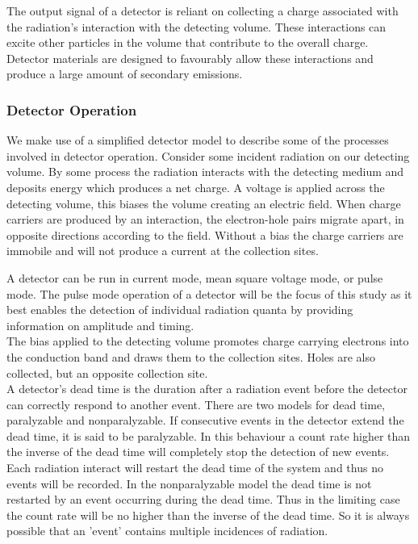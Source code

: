 \documentclass[12pt]{article}
\begin{document}
\begin{doublespacing}
The output signal of a detector is reliant on collecting a charge associated with the radiation's interaction with the detecting volume. 
These interactions can excite other particles in the volume that contribute to the overall charge.
Detector materials are designed to favourably allow these interactions and produce a large amount of secondary emissions. 
\\


\subsubsection{Detector Operation}
We make use of a simplified detector model to describe some of the processes involved in detector operation.
Consider some incident radiation on our detecting volume. 
By some process the radiation interacts with the detecting medium and deposits energy which produces a net charge. 
A voltage is applied across the detecting volume, this biases the volume creating an electric field. 
When charge carriers are produced by an interaction, the electron-hole pairs migrate apart, in opposite directions according to the field. 
Without a bias the charge carriers are immobile and will not produce a current at the collection sites.

A detector can be run in current mode, mean square voltage mode, or pulse mode. 
The pulse mode operation of a detector will be the focus of this study as it best enables the detection of individual radiation quanta by providing information on amplitude and timing.
\\

The bias applied to the detecting volume promotes charge carrying electrons into the conduction band and draws them to the collection sites. 
Holes are also collected, but an opposite collection site.
\\

A detector's dead time is the duration after a radiation event before the detector can correctly respond to another event.
There are two models for dead time, paralyzable and nonparalyzable. 
If consecutive events in the detector extend the dead time, it is said to be paralyzable. 
In this behaviour a count rate higher than the inverse of the dead time will completely stop the detection of new events. 
Each radiation interact will restart the dead time of the system and thus no events will be recorded. 
In the nonparalyzable model the dead time is not restarted by an event occurring during the dead time. 
Thus in the limiting case the count rate will be no higher than the inverse of the dead time.
So it is always possible that an 'event' contains multiple incidences of radiation.
\\


\end{doublespacing}
\end{document}
